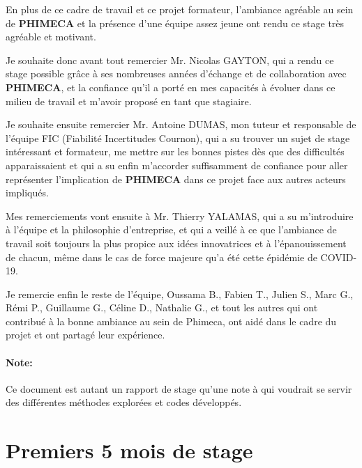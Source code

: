\documentclass[a4paper,10pt]{article}
\begin{document}
En plus de ce cadre de travail et ce projet formateur, l'ambiance agréable au sein de \textbf{PHIMECA} et la présence d'une équipe assez jeune ont rendu ce stage très agréable et motivant.\bigskip

Je souhaite donc avant tout remercier Mr. Nicolas GAYTON, qui a rendu ce stage possible grâce à ses nombreuses années d'échange et de collaboration avec \textbf{PHIMECA}, et la confiance qu'il a porté en mes capacités à évoluer dans ce milieu de travail et m'avoir proposé en tant que stagiaire. \bigskip

Je souhaite ensuite remercier Mr. Antoine DUMAS, mon tuteur et responsable de l'équipe FIC (Fiabilité Incertitudes Cournon), qui a su trouver un sujet de stage intéressant et formateur, me mettre sur les bonnes pistes dès que des difficultés apparaissaient et qui a su enfin m'accorder suffisamment de confiance pour aller représenter l'implication de \textbf{PHIMECA} dans ce projet face aux autres acteurs impliqués. \bigskip

Mes remerciements vont ensuite à Mr. Thierry YALAMAS, qui a su m'introduire à l'équipe et la philosophie d'entreprise, et qui a veillé à ce que l'ambiance de travail soit toujours la plus propice aux idées innovatrices et à l'épanouissement de chacun, même dans le cas de force majeure qu'a été cette épidémie de COVID-19. \bigskip

Je remercie enfin le reste de l'équipe, Oussama B., Fabien T., Julien S., Marc G., Rémi P., Guillaume G., Céline D., Nathalie G., et tout les autres qui ont contribué à la bonne ambiance au sein de Phimeca, ont aidé dans le cadre du projet et ont partagé leur expérience. 

\paragraph{Note:}
Ce document est autant un rapport de stage qu'une note à qui voudrait se servir des différentes méthodes explorées et codes développés.

\newpage
\section{Premiers 5 mois de stage}
\end{document}
